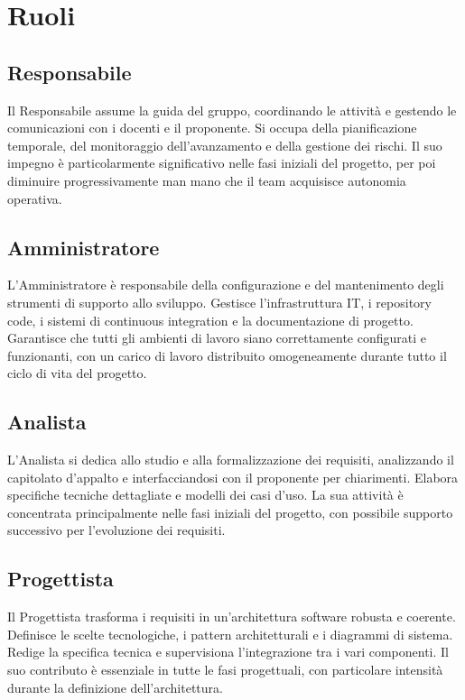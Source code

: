 \documentclass[a4paper,11pt]{article}
\begin{document}
\newpage

\section{Ruoli}

\subsection{Responsabile}
Il Responsabile assume la guida del gruppo, coordinando le attività e gestendo le comunicazioni con i docenti e il proponente. Si occupa della pianificazione temporale, del monitoraggio dell'avanzamento e della gestione dei rischi. Il suo impegno è particolarmente significativo nelle fasi iniziali del progetto, per poi diminuire progressivamente man mano che il team acquisisce autonomia operativa.

\subsection{Amministratore}
L'Amministratore è responsabile della configurazione e del mantenimento degli strumenti di supporto allo sviluppo. Gestisce l'infrastruttura IT, i repository code, i sistemi di continuous integration e la documentazione di progetto. Garantisce che tutti gli ambienti di lavoro siano correttamente configurati e funzionanti, con un carico di lavoro distribuito omogeneamente durante tutto il ciclo di vita del progetto.

\subsection{Analista}
L'Analista si dedica allo studio e alla formalizzazione dei requisiti, analizzando il capitolato d'appalto e interfacciandosi con il proponente per chiarimenti. Elabora specifiche tecniche dettagliate e modelli dei casi d'uso. La sua attività è concentrata principalmente nelle fasi iniziali del progetto, con possibile supporto successivo per l'evoluzione dei requisiti.

\subsection{Progettista}
Il Progettista trasforma i requisiti in un'architettura software robusta e coerente. Definisce le scelte tecnologiche, i pattern architetturali e i diagrammi di sistema. Redige la specifica tecnica e supervisiona l'integrazione tra i vari componenti. Il suo contributo è essenziale in tutte le fasi progettuali, con particolare intensità durante la definizione dell'architettura.
\end{document}
